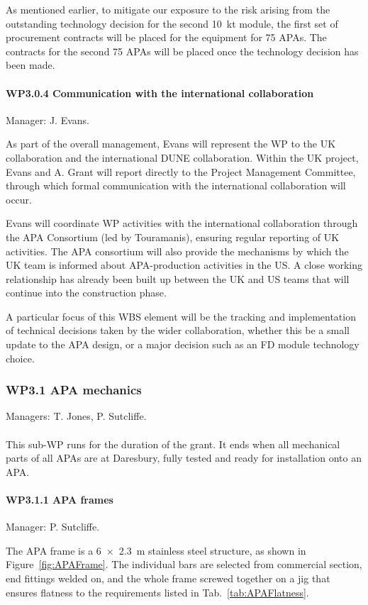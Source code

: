 As mentioned earlier, to mitigate our exposure to the risk arising from the outstanding technology decision for the second \SI{10}{\kilo\tonne} module, the first set of procurement contracts will be placed for the equipment for 75 APAs. The contracts for the second 75 APAs will be placed once the technology decision has been made.

\paragraph{WP3.0.4 Communication with the international collaboration}

Manager: J. Evans.

As part of the overall management, Evans will represent the WP to the UK collaboration and the international DUNE collaboration. Within the UK project, Evans and A. Grant will report directly to the Project Management Committee, through which formal communication with the international collaboration will occur.

Evans will coordinate WP activities with the international collaboration through the APA Consortium (led by Touramanis), ensuring regular reporting of UK activities. The APA consortium will also provide the mechanisms by which the UK team is informed about APA-production activities in the US. A close working relationship has already been built up between the UK and US teams that will continue into the construction phase.

A particular focus of this WBS element will be the tracking and implementation of technical decisions taken by the wider collaboration, whether this be a small update to the APA design, or a major decision such as an FD module technology choice.

\subsubsection{WP3.1 APA mechanics}
Managers: T. Jones, P. Sutcliffe.\\
\\ This sub-WP runs for the duration of the grant. It ends when all mechanical parts of all APAs are at Daresbury, fully tested and ready for installation onto an APA.

\paragraph{WP3.1.1 APA frames} Manager: P. Sutcliffe.

The APA frame is a \SI{6x2.3}{\metre} stainless steel structure, as shown in Figure~\ref{fig:APAFrame}. The individual bars are selected from commercial section, end fittings welded on, and the whole frame screwed together on a jig that ensures flatness to the requirements listed in Tab.~\ref{tab:APAFlatness}.

